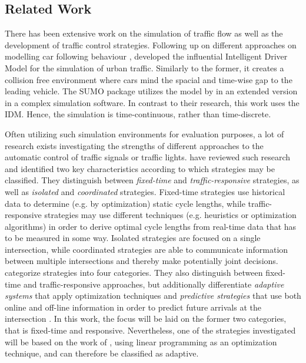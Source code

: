 \documentclass[10pt]{article}
\begin{document}
\subsection{Related Work}
\label{sec:related-work}
There has been extensive work on the simulation of traffic flow as well as the development of traffic control strategies. Following up on different approaches on modelling car following behaviour \citep[e.g.][]{gipps1981behavioural}, \citet{treiber2000congested} developed the influential Intelligent Driver Model for the simulation of urban traffic. Similarly to the former, it creates a collision free environment where cars mind the  spacial and time-wise gap to the leading vehicle. The SUMO package \citep{krajzewicz2002sumo, behrisch2011sumo} utilizes the model by \citep{gipps1981behavioural} in an extended version \citep{krauss1998microscopic} in a complex simulation software. In contrast to their research, this work uses the IDM. Hence, the simulation is time-continuous, rather than time-discrete.

Often utilizing such simulation environments for evaluation purposes, a lot of research exists investigating the strengths of different approaches to the automatic control of traffic signals or traffic lights. \citet{papageorgiou2003review} have reviewed such research and identified two key characteristics according to which strategies may be classified. They distinguish between \textit{fixed-time} and \textit{traffic-responsive} strategies, as well as \textit{isolated} and \textit{coordinated} strategies. Fixed-time strategies use historical data to determine (e.g. by optimization) static cycle lengths, while traffic-responsive strategies may use different techniques (e.g. heuristics or optimization algorithms) in order to derive optimal cycle lengths from real-time data that has to be measured in some way. Isolated strategies are focused on a single intersection, while coordinated strategies are able to communicate information between multiple intersections and thereby make potentially joint decisions. \citet{coll2013linear} categorize strategies into four categories. They also distinguish between fixed-time and traffic-responsive approaches, but additionally differentiate \textit{adaptive systems} that apply optimization techniques and \textit{predictive strategies} that use both online and off-line information in order to predict future arrivals at the intersection \citep{coll2013linear}. In this work, the focus will be laid on the former two categories, that is fixed-time and responsive. Nevertheless, one of the strategies investigated will be based on the work of \citep{coll2013linear}, using linear programming as an optimization technique, and can therefore be classified as adaptive.
\end{document}
